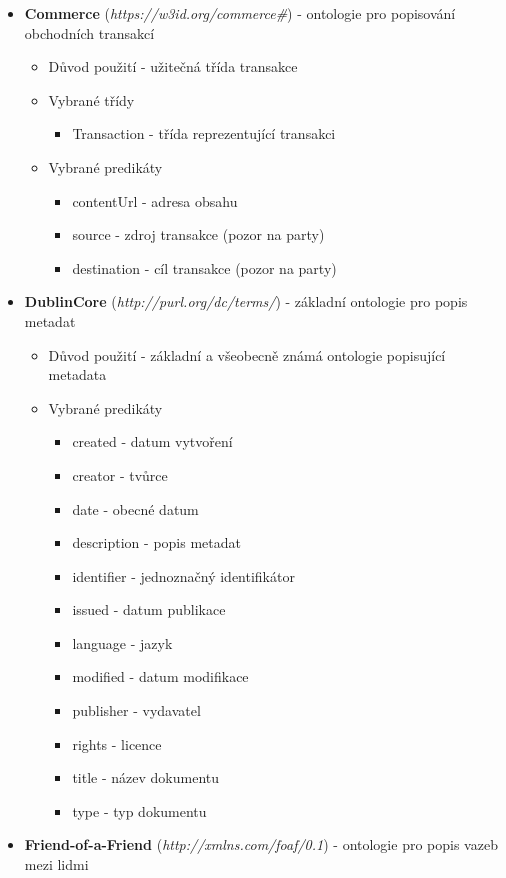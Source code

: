 \begin{itemize}
\item \textbf{Commerce} (\textit{https://w3id.org/commerce\#}) - ontologie pro popisování obchodních transakcí
	\begin{itemize}
	\item Důvod použití - užitečná třída transakce 
	\item Vybrané třídy 
		\begin{itemize}
		\item Transaction - třída reprezentující transakci 
		\end{itemize}
	\item Vybrané predikáty
		\begin{itemize}
		\item contentUrl - adresa obsahu
		\item source - zdroj transakce (pozor na party)
		\item destination - cíl transakce  (pozor na party)
		\end{itemize}
	\end{itemize}
\item \textbf{DublinCore} (\textit{http://purl.org/dc/terms/}) - základní ontologie pro popis metadat 
	\begin{itemize}
	\item Důvod použití - základní a všeobecně známá ontologie popisující metadata
	\item Vybrané predikáty
		\begin{itemize}
		\item created - datum vytvoření
		\item creator - tvůrce
		\item date - obecné datum
		\item description - popis metadat
		\item identifier - jednoznačný identifikátor
		\item issued - datum publikace
		\item language - jazyk
		\item modified - datum modifikace
		\item publisher - vydavatel
		\item rights - licence
		\item title - název dokumentu
		\item type - typ dokumentu
		\end{itemize}
	\end{itemize}
\item \textbf{Friend-of-a-Friend} (\textit{http://xmlns.com/foaf/0.1}) - ontologie pro popis vazeb mezi lidmi

\end{itemize}
